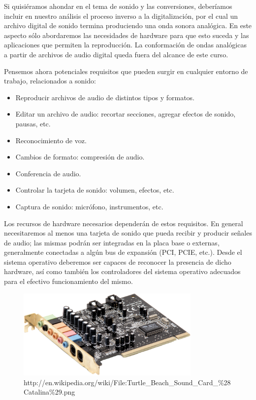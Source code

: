 \documentclass[12pt]{article}
\begin{document}
Si quisiéramos ahondar en el tema de sonido y las conversiones, deberíamos 
incluir en nuestro análisis el proceso inverso a la digitalización, por el 
cual un archivo digital de sonido termina produciendo una onda sonora 
analógica. En este aspecto sólo abordaremos las necesidades de hardware
para que esto suceda y las aplicaciones que permiten la reproducción. La
conformación de ondas analógicas a partir de archivos de audio digital 
queda fuera del alcance de este curso. 

Pensemos ahora potenciales requisitos que pueden surgir en cualquier entorno 
de trabajo, relacionados a sonido:
\begin{itemize}
\item Reproducir archivos de audio de distintos tipos y formatos.  
\item Editar un archivo de audio: recortar secciones, 
agregar efectos de sonido, pausas, etc. 
\item Reconocimiento de voz. 
\item Cambios de formato: compresión de audio. 
\item Conferencia de audio. 
\item Controlar la tarjeta de sonido: volumen, efectos, etc.
\item Captura de sonido: micrófono, instrumentos, etc. 
\end{itemize}

Los recursos de hardware necesarios dependerán de estos requisitos.  
En general necesitaremos al menos una tarjeta de sonido que pueda 
recibir y producir señales de audio; las mismas podrán ser integradas
en la placa base o externas, generalmente conectadas a algún bus de
expansión (PCI, PCIE, etc.). Desde el sistema operativo deberemos ser 
capaces de reconocer la presencia de dicho hardware, así como también 
los controladores del sistema operativo adecuados para el efectivo 
funcionamiento del mismo.


\begin{figure}[h]
\centering
\includegraphics[width=0.8\textwidth]{soundcards.png}
\renewcommand{\figurename}{Fig.}
\caption{http://en.wikipedia.org/wiki/File:Turtle\_Beach\_Sound\_Card\_\%28Catalina\%29.png}
\label{contexto:figura}
\end{figure}
\end{document}
